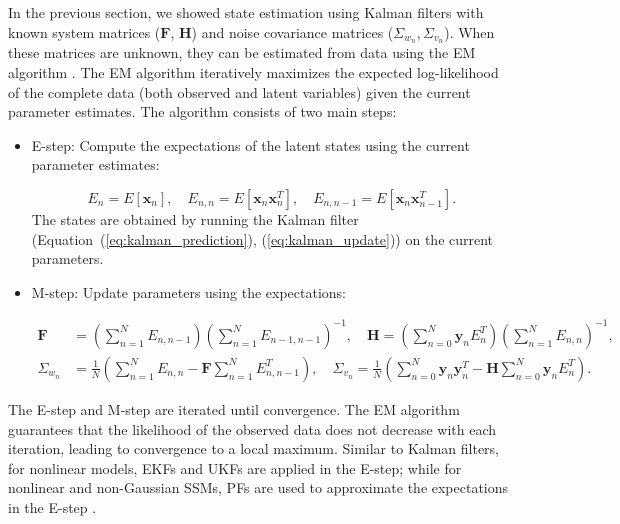 In the previous section, we showed state estimation using Kalman filters with known system matrices ($\boldsymbol{F}$, $\boldsymbol{H}$) and noise covariance matrices ($\Sigma_{w_n}, \Sigma_{v_n}$). When these matrices are unknown, they can be estimated from data using the \ac{EM} algorithm \citep{Dempster1977}. The \ac{EM} algorithm iteratively maximizes the expected log-likelihood of the complete data (both observed and latent variables) given the current parameter estimates. The algorithm consists of two main steps:
\begin{itemize}[noitemsep,topsep=2pt]
    \item E-step: Compute the expectations of the latent states using the current parameter estimates:
    
    \begin{equation*}
        E_n=E[\boldsymbol{x}_n],\quad E_{n,n}=E[\boldsymbol{x}_n\boldsymbol{x}_n^T],\quad E_{n,n-1}=E[\boldsymbol{x}_n\boldsymbol{x}_{n-1}^T].
    \end{equation*}
    The states are obtained by running the Kalman filter (Equation~(\ref{eq:kalman_prediction}), (\ref{eq:kalman_update})) on the current parameters.
    
    \item M-step: Update parameters using the expectations:
    
    \begin{subequations}
        \begin{align*}
            \boldsymbol{F}&=\left(\sum_{n=1}^{N}E_{n,n-1}\right)\left(\sum_{n=1}^{N}E_{n-1, n-1}\right)^{-1}, \quad \boldsymbol{H}=\left(\sum_{n=0}^{N}\boldsymbol{y}_nE_n^T\right)\left(\sum_{n=1}^{N}E_{n,n}\right)^{-1}, \\
            \Sigma_{w_n}&=\frac{1}{N}\left(\sum_{n=1}^{N}E_{n,n}-\boldsymbol{F}\sum_{n=1}^{N}E_{n,n-1}^T\right), \quad \Sigma_{v_n}=\frac{1}{N}\left(\sum_{n=0}^{N}\boldsymbol{y}_n\boldsymbol{y}_n^T-\boldsymbol{H}\sum_{n=0}^{N}\boldsymbol{y}_nE_n^T\right).
        \end{align*}
    \end{subequations}
\end{itemize}
The E-step and M-step are iterated until convergence. The \ac{EM} algorithm guarantees that the likelihood of the observed data does not decrease with each iteration, leading to convergence to a local maximum. Similar to Kalman filters, for nonlinear models, \acp{EKF} and \acp{UKF} are applied in the E-step; while for nonlinear and non-Gaussian \acp{SSM}, \acp{PF} are used to approximate the expectations in the E-step \citep{Durbin2000}.

